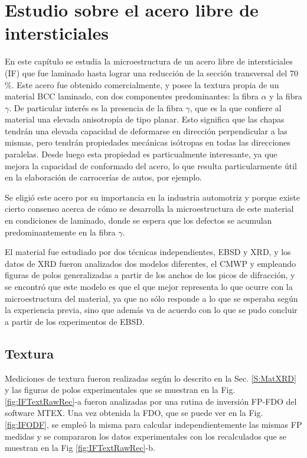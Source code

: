 \chapter{Estudio sobre el acero libre de intersticiales}\label{C:IF}
\graphicspath{{./figs/03_IF/}}

En este capítulo se estudia la microestructura de un acero libre de intersticiales (IF) que fue laminado hasta lograr una reducción de la sección transversal del 70\,\%.
Este acero fue obtenido comercialmente, y posee la textura propia de un material BCC laminado, con dos componentes predominantes: la fibra $\alpha$ y la fibra $\gamma$.
De particular interés es la presencia de la fibra $\gamma$, que es la que confiere al material una elevada anisotropía de tipo planar\cite{Engler2001,Hutchinson1984,Ray1994}.
Esto significa que las chapas tendrán una elevada capacidad de deformarse en dirección perpendicular a las mismas, pero tendrán propiedades mecánicas isótropas en todas las direcciones paralelas.
Desde luego esta propiedad es particualmente interesante, ya que mejora la capacidad de conformado del acero, lo que resulta particularmente útil en la elaboración de carrocerías de autos, por ejemplo.

Se eligió este acero por su importancia en la industria automotriz y porque existe cierto consenso acerca de cómo se desarrolla la microestructura de este material en condiciones de laminado, donde se espera que los defectos se acumulan predominantemente en la fibra $\gamma$.

El material fue estudiado por dos técnicas independientes, EBSD y XRD, y los datos de XRD fueron analizados dos modelos diferentes, el CMWP y empleando figuras de polos generalizadas a partir de los anchos de los picos de difracción, y se encontró que este modelo es que el que mejor representa lo que ocurre con la microestructura del material, ya que no sólo responde a lo que se esperaba según la experiencia previa, sino que además va de acuerdo con lo que se pudo concluir a partir de los experimentos de EBSD.

\section{Textura}\label{S:IFText}
Mediciones de textura fueron realizadas según lo descrito en la Sec. \ref{S:MatXRD} y las figuras de polos experimentales que se muestran en la Fig. \ref{fig:IFTextRawRec}-a fueron analizadas por una rutina de inversión FP-FDO del software MTEX.
Una vez obtenida la FDO, que se puede ver en la Fig. \ref{fig:IFODF}, se empleó la misma para calcular independientemente las mismas FP medidas y se compararon los datos experimentales con los recalculados que se muestran en la Fig \ref{fig:IFTextRawRec}-b.

